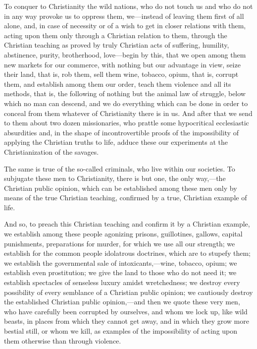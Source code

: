 \documentclass{book}
\begin{document}
To conquer to Christianity the wild nations, who do not touch us and who do not in any way provoke us to oppress them, we—instead of leaving them first of all alone, and, in case of necessity or of a wish to get in closer relations with them, acting upon them only through a Christian relation to them, through the Christian teaching as proved by truly Christian acts of suffering, humility, abstinence, purity, brotherhood, love—begin by this, that we open among them new markets for our commerce, with nothing but our advantage in view, seize their land, that is, rob them, sell them wine, tobacco, opium, that is, corrupt them, and establish among them our order, teach them violence and all its methods, that is, the following of nothing but the animal law of struggle, below which no man can descend, and we do everything which can be done in order to conceal from them whatever of Christianity there is in us. And after that we send to them about two dozen missionaries, who prattle some hypocritical ecclesiastic absurdities and, in the shape of incontrovertible proofs of the impossibility of applying the Christian truths to life, adduce these our experiments at the Christianization of the savages.

The same is true of the so-called criminals, who live within our societies. To subjugate these men to Christianity, there is but one, the only way,—the Christian public opinion, which can be established among these men only by means of the true Christian teaching, confirmed by a true, Christian example of life.

And so, to preach this Christian teaching and confirm it by a Christian example, we establish among these people agonizing prisons, guillotines, gallows, capital punishments, preparations for murder, for which we use all our strength; we establish for the common people idolatrous doctrines, which are to stupefy them; we establish the governmental sale of intoxicants,—wine, tobacco, opium; we establish even prostitution; we give the land to those who do not need it; we establish spectacles of senseless luxury amidst wretchedness; we destroy every possibility of every semblance of a Christian public opinion; we cautiously destroy the established Christian public opinion,—and then we quote these very men, who have carefully been corrupted by ourselves, and whom we lock up, like wild beasts, in places from which they cannot get away, and in which they grow more bestial still, or whom we kill, as examples of the impossibility of acting upon them otherwise than through violence.
\end{document}
